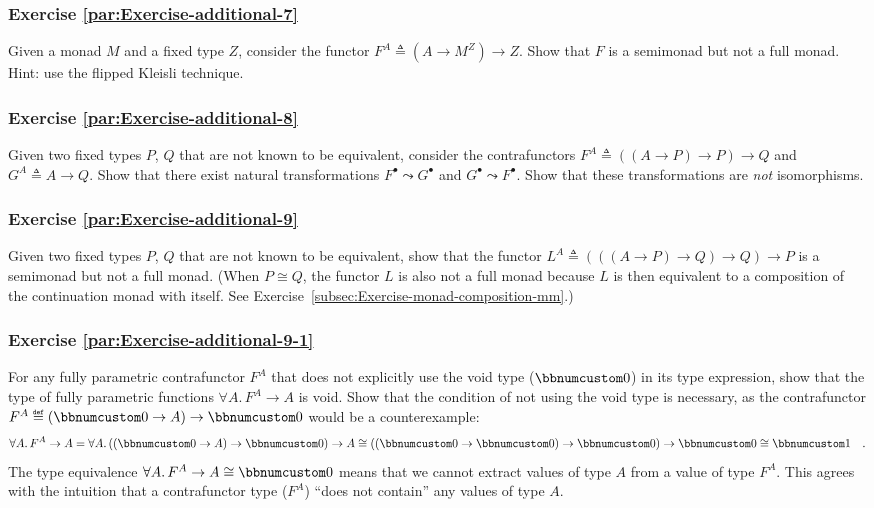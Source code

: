 \subsubsection{Exercise \label{par:Exercise-additional-7}\ref{par:Exercise-additional-7}}

Given a monad $M$ and a fixed type $Z$, consider the functor $F^{A}\triangleq(A\rightarrow M^{Z})\rightarrow Z$.
Show that $F$ is a semimonad but not a full monad. Hint: use the
flipped Kleisli technique.

\subsubsection{Exercise \label{par:Exercise-additional-8}\ref{par:Exercise-additional-8}}

Given two fixed types $P$, $Q$ that are not known to be equivalent,
consider the contrafunctors $F^{A}\triangleq\left(\left(A\rightarrow P\right)\rightarrow P\right)\rightarrow Q$
and $G^{A}\triangleq A\rightarrow Q$. Show that there exist natural
transformations $F^{\bullet}\leadsto G^{\bullet}$ and $G^{\bullet}\leadsto F^{\bullet}$.
Show that these transformations are \emph{not} isomorphisms.

\subsubsection{Exercise \label{par:Exercise-additional-9}\ref{par:Exercise-additional-9}}

Given two fixed types $P$, $Q$ that are not known to be equivalent,
show that the functor $L^{A}\triangleq\left(\left(\left(A\rightarrow P\right)\rightarrow Q\right)\rightarrow Q\right)\rightarrow P$
is a semimonad but not a full monad. (When $P\cong Q$, the functor
$L$ is also not a full monad because $L$ is then equivalent to a
composition of the continuation monad with itself. See Exercise~\ref{subsec:Exercise-monad-composition-mm}.)

\subsubsection{Exercise \label{par:Exercise-additional-9-1}\ref{par:Exercise-additional-9-1}}

For any fully parametric contrafunctor $F^{A}$ that does not explicitly
use the void type ($\bbnum 0$) in its type expression,
show that the type of fully parametric functions $\forall A.\,F^{A}\rightarrow A$
is void. Show that the condition of not using the void type is necessary,
as the contrafunctor $F^{A}\triangleq(\bbnum 0\rightarrow A)\rightarrow\bbnum 0$
would be a counterexample:
\[
\forall A.\,F^{A}\rightarrow A=\forall A.\,((\bbnum 0\rightarrow A)\rightarrow\bbnum 0)\rightarrow A\cong((\bbnum 0\rightarrow\bbnum 0)\rightarrow\bbnum 0)\rightarrow\bbnum 0\cong\bbnum 1\quad.
\]
The type equivalence $\forall A.\,F^{A}\rightarrow A\cong\bbnum 0$
means that we cannot extract values of type $A$ from a value of type
$F^{A}$. This agrees with the intuition that a contrafunctor type
($F^{A}$) \textsf{``}does not contain\textsf{''} any values of type $A$.

